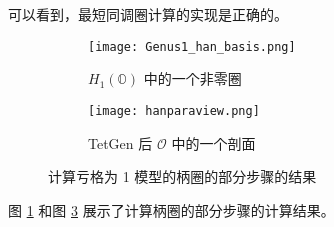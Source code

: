 可以看到，最短同调圈计算的实现是正确的。

\begin{figure}[h]
    \begin{subfigure}{.5\textwidth}
        \centering
        \texttt{[image: Genus1\_han\_basis.png]}
        \caption{$ H_1(\mathbb{O}) $ 中的一个非零圈}
        \label{fig:hanh1o}
    \end{subfigure}
    \begin{subfigure}{.5\textwidth}
        \centering
        \texttt{[image: hanparaview.png]}
        \caption{TetGen 后 $ \mathcal{O} $ 中的一个剖面}
        \label{fig:hanparaview}
    \end{subfigure}
    \caption{计算亏格为 1 模型的柄圈的部分步骤的结果}
\end{figure}

图 \ref{fig:hanh1o} 和图 \ref{fig:hanparaview} 展示了计算柄圈的部分步骤的计算结果。